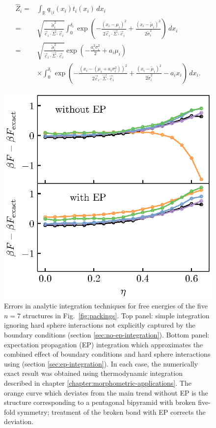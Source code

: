 \documentclass[11pt,twoside]{report}
\begin{document}
\begin{align}
  \hat{Z}_i
  =&
  \int_{\mathbb{R}} q_{\setminus i}(x_i) t_i(x_i) \, dx_i
  \nonumber \\ =&
  \sqrt{ \frac{\tilde{\sigma}_i^2}{\vec{c}_i \cdot \vec{\Sigma} \cdot \vec{c}_i} }
  \int_0^{\delta_i}
  \exp{\left( -\frac{(x_i - \mu_i)^2}{2 \vec{c}_i \cdot \vec{\Sigma} \cdot \vec{c}_i} +
    \frac{(x_i - \tilde{\mu}_i)^2}{2 \tilde{\sigma}_i^2} \right)} \, dx_i
  \nonumber \\ =&
  \sqrt{ \frac{\tilde{\sigma}_i^2}{\vec{c}_i \cdot \vec{\Sigma} \cdot \vec{c}_i} }
  \exp{\left(
    - \frac{a_i^2 \sigma_i^2}{2}
    + a_i \mu_i
    \right)}
  \nonumber \\ &
  \times \int_0^{\delta_i}
  \exp{\left( -\frac{(x_i - (\mu_i + a_i \sigma_i^2))^2}{2 \vec{c}_i \cdot \vec{\Sigma} \cdot \vec{c}_i} +
    \frac{(x_i - \tilde{\mu}_i)^2}{2 \tilde{\sigma}_i^2} - a_i x_i \right)} \, dx_i.
\end{align}

\begin{figure}
  \includegraphics[width=0.9\linewidth,outer]{ep-n7}
  \caption[Errors in analytical integration techniques for the free energies of $n=7$ structures]{
    Errors in analytic integration techniques for free energies of the five $n = 7$ structures in Fig.\ \ref{fig:packings}.
    Top panel: simple integration ignoring hard sphere interactions not explicitly captured by the boundary conditions (section \ref{sec:no-ep-integration}).
    Bottom panel: expectation propagation (EP) integration which approximates the combined effect of boundary conditions and hard sphere interactions using (section \ref{sec:ep-integration}).
    In each case, the numerically exact result was obtained using thermodynamic integration described in chapter \ref{chapter:morphometric-applications}.
    The orange curve which deviates from the main trend without EP is the structure corresponding to a pentagonal bipyramid with broken five-fold symmetry; treatment of the broken bond with EP corrects the deviation.
  }
  \label{fig:ep-n7}
\end{figure}
\end{document}

